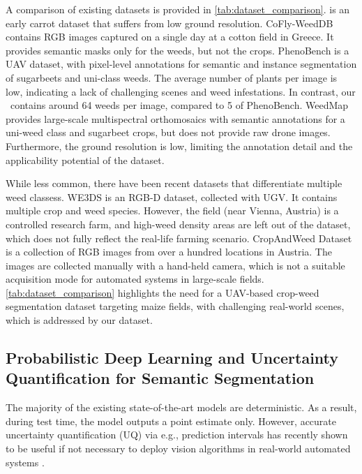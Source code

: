 A comparison of existing datasets is provided in \cref{tab:dataset_comparison}. \cite{haug15} is an early carrot dataset that suffers from low ground resolution.
CoFly-WeedDB \cite{KRESTENITIS2022108575} contains RGB images captured on a single day at a cotton field in Greece.
It provides semantic masks only for the weeds, but not the crops.
PhenoBench \cite{weyler2023phenobench} is a UAV dataset, with pixel-level annotations for semantic and instance segmentation of sugarbeets and uni-class weeds.
The average number of plants per image is low, indicating a lack of challenging scenes and weed infestations.
In contrast, our \dname~contains around 64 weeds per image, compared to 5 of PhenoBench. WeedMap \cite{rs10091423} provides large-scale multispectral orthomosaics with semantic annotations for a uni-weed class and sugarbeet crops, but does not provide raw drone images.
Furthermore, the ground resolution is low, limiting the annotation detail and the applicability potential of the dataset.

While less common, there have been recent datasets that differentiate multiple weed classess. WE3DS \cite{s23052713} is an RGB-D dataset, collected with  UGV.
It contains multiple crop and weed species. However, the field (near Vienna, Austria) is a controlled research farm, and high-weed density areas are left out of the dataset, which does not fully reflect the real-life farming scenario.
CropAndWeed Dataset \cite{Steininger_2023_WACV} is a collection of RGB images from over a hundred locations in Austria.
The images are collected manually with a hand-held camera, which is not a suitable acquisition mode for automated systems in large-scale fields. \cref{tab:dataset_comparison} highlights the need for a UAV-based crop-weed segmentation dataset targeting maize fields, with challenging real-world scenes, which is addressed by our dataset.








\subsection{Probabilistic Deep Learning and Uncertainty Quantification for Semantic Segmentation}
\label{sec:probabilistic_dl}
The majority of the existing state-of-the-art models are deterministic. As a result, during test time, the model outputs a point estimate only. However, accurate uncertainty quantification (UQ) via e.g., prediction intervals has recently shown to be useful if not necessary to deploy vision algorithms in real-world automated systems \cite{9506719, Sagar_2022_WACV, HERNANDEZ2020106597, Fang_2020}.

